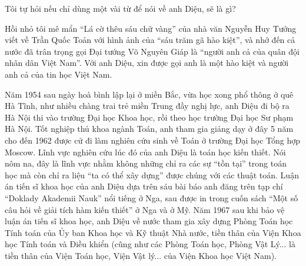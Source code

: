 Tôi tự hỏi nếu chỉ dùng một vài từ để nói về anh Diệu, sẽ là gì?

Hồi nhỏ tôi mê mẩn “Lá cờ thêu sáu chữ vàng” của nhà văn Nguyễn Huy Tưởng viết về Trần Quốc Toản với hình ảnh của “sáu trăm gã hào kiệt”, và nhớ đến cả nước đã trân trọng gọi Đại tướng Võ Nguyên Giáp là “người anh cả của quân đội nhân dân Việt Nam”. Với anh Diệu, xin được gọi anh là một hào kiệt và người anh cả của tin học Việt Nam.

Năm 1954 sau ngày hoà bình lập lại ở miền Bắc, vừa học xong phổ thông ở quê Hà Tĩnh, như nhiều chàng trai trẻ miền Trung đầy nghị lực, anh Diệu đi bộ ra Hà Nội thi vào trường Đại học Khoa học, rồi theo học trường Đại học Sư phạm Hà Nội. Tốt nghiệp thủ khoa ngành Toán, anh tham gia giảng dạy ở đây 5 năm cho đến 1962 được cử đi làm nghiên cứu sinh về Toán ở trường Đại học Tổng hợp Moscow. Lĩnh vực nghiên cứu lúc đó của anh Diệu là toán học kiến thiết. Nói nôm na, đây là lĩnh vực nhằm không những chỉ ra các sự “tồn tại” trong toán học mà còn chỉ ra liệu “ta có thể xây dựng” được chúng với các thuật toán. Luận án tiến sĩ khoa học của anh Diệu dựa trên sáu bài báo anh đăng trên tạp chí “Doklady Akademii Nauk” nổi tiếng ở Nga, sau được in trong cuốn sách “Một số câu hỏi về giải tích hàm kiến thiết” ở Nga và ở Mỹ. Năm 1967 sau khi bảo vệ luận án tiến sĩ khoa học, anh Diệu về nước tham gia xây dựng Phòng Toán học Tính toán của Ủy ban Khoa học và Kỹ thuật Nhà nước, tiền thân của Viện Khoa học Tính toán và Điều khiển (cũng như các Phòng Toán học, Phòng Vật Lý... là tiền thân của Viện Toán học, Viện Vật lý... của Viện Khoa học Việt Nam).